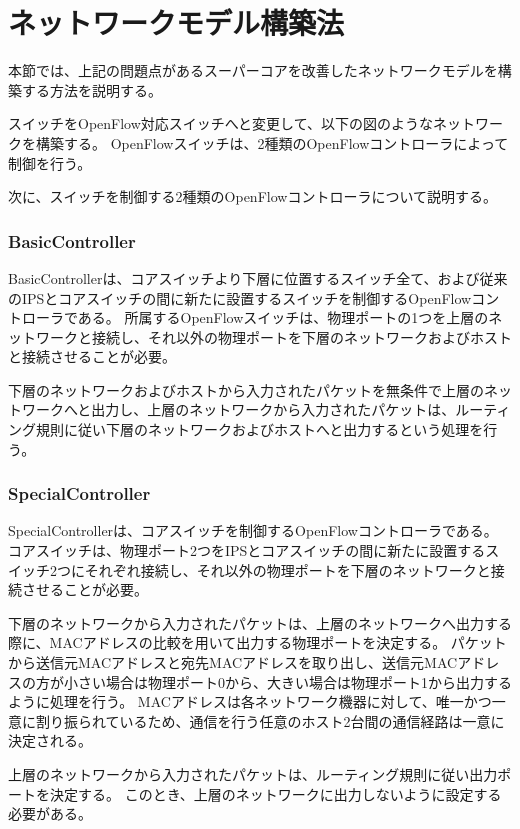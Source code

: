 \section{ネットワークモデル構築法}

本節では、上記の問題点があるスーパーコアを改善したネットワークモデルを構築する方法を説明する。

スイッチをOpenFlow対応スイッチへと変更して、以下の図のようなネットワークを構築する。
OpenFlowスイッチは、2種類のOpenFlowコントローラによって制御を行う。


次に、スイッチを制御する2種類のOpenFlowコントローラについて説明する。

\subsubsection{BasicController}

BasicControllerは、コアスイッチより下層に位置するスイッチ全て、および従来のIPSとコアスイッチの間に新たに設置するスイッチを制御するOpenFlowコントローラである。
所属するOpenFlowスイッチは、物理ポートの1つを上層のネットワークと接続し、それ以外の物理ポートを下層のネットワークおよびホストと接続させることが必要。

下層のネットワークおよびホストから入力されたパケットを無条件で上層のネットワークへと出力し、上層のネットワークから入力されたパケットは、ルーティング規則に従い下層のネットワークおよびホストへと出力するという処理を行う。

\subsubsection{SpecialController}

SpecialControllerは、コアスイッチを制御するOpenFlowコントローラである。
コアスイッチは、物理ポート2つをIPSとコアスイッチの間に新たに設置するスイッチ2つにそれぞれ接続し、それ以外の物理ポートを下層のネットワークと接続させることが必要。

下層のネットワークから入力されたパケットは、上層のネットワークへ出力する際に、MACアドレスの比較を用いて出力する物理ポートを決定する。
パケットから送信元MACアドレスと宛先MACアドレスを取り出し、送信元MACアドレスの方が小さい場合は物理ポート0から、大きい場合は物理ポート1から出力するように処理を行う。
MACアドレスは各ネットワーク機器に対して、唯一かつ一意に割り振られているため、通信を行う任意のホスト2台間の通信経路は一意に決定される。

上層のネットワークから入力されたパケットは、ルーティング規則に従い出力ポートを決定する。
このとき、上層のネットワークに出力しないように設定する必要がある。